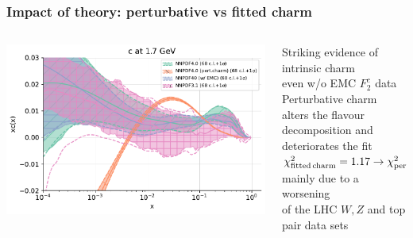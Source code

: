 \documentclass{beamer}
\begin{document}
\begin{frame}
 \frametitle{Impact of theory: perturbative vs fitted charm}
 \footnotesize
 \centering
 \begin{columns}[c]
  \begin{column}{0.5\textwidth}
   \centering
   \includegraphics[width=\columnwidth]{plots/charm_1}\\
  \end{column}
  \begin{column}{0.5\textwidth}
   \centering
   Striking evidence of intrinsic charm\\
   {\scriptsize even w/o EMC $F_2^c$ data}\\
   \vspace{0.2cm}
   Perturbative charm alters the flavour decomposition and deteriorates the fit\\
   \vspace{0.1cm}
   {\scriptsize $\chi^2_{\rm fitted\,charm}=1.17\to \chi^2_{\rm pert.\,charm}=1.19$}\\
   \vspace{0.2cm}
   {\scriptsize mainly due to a worsening\\ of the LHC $W,Z$ and top pair data sets}\\
  \end{column}
 \end{columns}
 \begin{columns}[c]
  \begin{column}{0.5\textwidth}
   \centering

\end{column}
\end{columns}
\end{frame}
\end{document}
